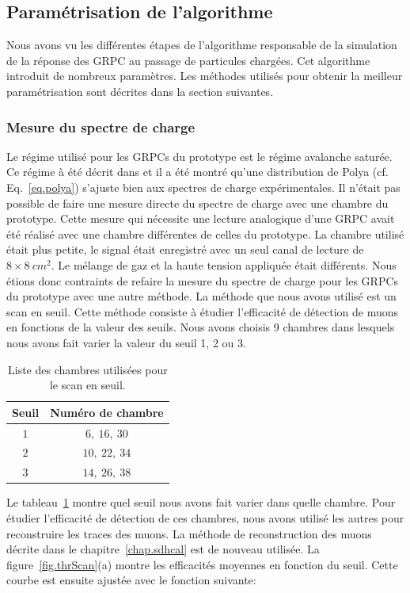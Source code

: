 \subsection{Paramétrisation de l'algorithme}
\label{sec.param}
Nous avons vu les différentes étapes de l'algorithme responsable de la simulation de la réponse des GRPC au passage de particules chargées. Cet algorithme introduit de nombreux paramètres. Les méthodes utilisés pour obtenir la meilleur paramétrisation sont décrites dans la section suivantes. 

\subsubsection{Mesure du spectre de charge}
% 
\label{sec.polya}
Le régime utilisé pour les GRPCs du prototype est le régime avalanche saturée. Ce régime à été décrit dans \cite{abbresciaPolya} et il a été montré qu'une distribution de Polya (cf. Eq.~\ref{eq.polya}) s'ajuste bien aux spectres de charge expérimentales. Il n'était pas possible de faire une mesure directe du spectre de charge avec une chambre du prototype. Cette mesure qui nécessite une lecture analogique d'une GRPC avait été réalisé avec une chambre différentes de celles du prototype. La chambre utilisé était plus petite, le signal était enregistré avec un seul canal de lecture de $8 \times 8 ~cm^{2}$. Le mélange de gaz et la haute tension appliquée était différents. Nous étions donc contraints de refaire la mesure du spectre de charge pour les GRPCs du prototype avec une autre méthode. La méthode que nous avons utilisé est un scan en seuil. Cette méthode consiste à étudier l'efficacité de détection de muons en fonctions de la valeur des seuils. Nous avons choisis 9 chambres dans lesquels nous avons fait varier la valeur du seuil 1, 2 ou 3.
\begin{table}[!ht]
  \begin{center}
    \begin{tabular}{c|c}
      Seuil & Numéro de chambre\\
      \hline
      $1$ & $6,~16,~30$\\
      $2$ & $10,~22,~34$\\
      $3$ & $14,~26,~38$\\
    \end{tabular}
  \end{center}
  \caption{Liste des chambres utilisées pour le scan en seuil.}
  \label{tab.thrScan}
\end{table}
Le tableau~\ref{tab.thrScan} montre quel seuil nous avons fait varier dans quelle chambre. Pour étudier l'efficacité de détection de ces chambres, nous avons utilisé les autres pour reconstruire les traces des muons. La méthode de reconstruction des muons décrite dans le chapitre~\ref{chap.sdhcal} est de nouveau utilisée. La figure~\ref{fig.thrScan}(a) montre les efficacités moyennes en fonction du seuil. Cette courbe est ensuite ajustée avec le fonction suivante:
